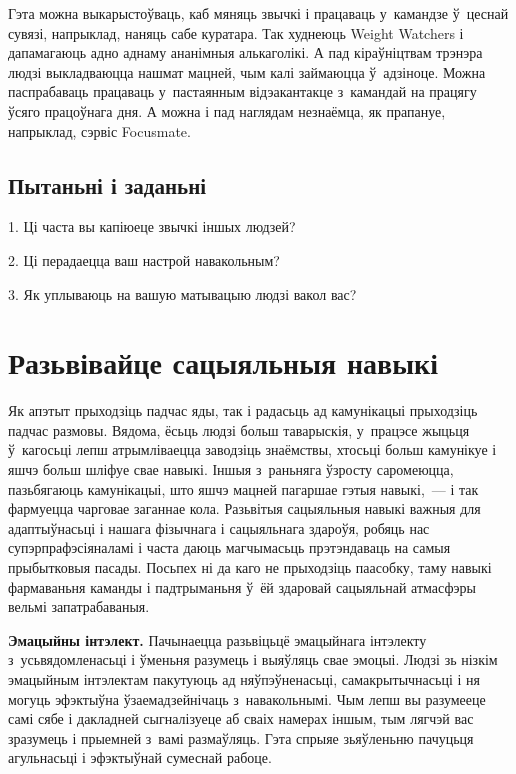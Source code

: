 Гэта можна выкарыстоўваць, каб мяняць звычкі і працаваць у~камандзе ў~цеснай сувязі, напрыклад, наняць сабе куратара. Так худнеюць Weight Watchers і дапамагаюць адно аднаму ананімныя алькаголікі. А пад кіраўніцтвам трэнэра людзі выкладваюцца нашмат мацней, чым калі займаюцца ў~адзіноце. Можна паспрабаваць працаваць у~пастаянным відэакантакце з~камандай на працягу ўсяго працоўнага дня. А можна і пад наглядам незнаёмца, як прапануе, напрыклад, сэрвіс Focusmate.

\subsection*{Пытаньні і заданьні}

1. Ці часта вы капіюеце звычкі іншых людзей?

2. Ці перадаецца ваш настрой навакольным?

3. Як уплываюць на вашую матывацыю людзі вакол вас?


\section{Разьвівайце сацыяльныя навыкі}

Як апэтыт прыходзіць падчас яды, так і радасьць ад камунікацыі прыходзіць падчас размовы. Вядома, ёсьць людзі больш таварыскія, у~працэсе жыцьця ў~кагосьці лепш атрымліваецца заводзіць знаёмствы, хтосьці больш камунікуе і яшчэ больш шліфуе свае навыкі. Іншыя з~раньняга ўзросту саромеюцца, пазьбягаюць камунікацыі, што яшчэ мацней пагаршае гэтыя навыкі,~--- і так фармуецца чарговае заганнае кола. Разьвітыя сацыяльныя навыкі важныя для адаптыўнасьці і нашага фізычнага і сацыяльнага здароўя, робяць нас супэрпрафэсіяналамі і часта даюць магчымасьць прэтэндаваць на самыя прыбытковыя пасады. Посьпех ні да каго не прыходзіць паасобку, таму навыкі фармаваньня каманды і падтрыманьня ў~ёй здаровай сацыяльнай атмасфэры вельмі запатрабаваныя.

\textbf{Эмацыйны інтэлект.} Пачынаецца разьвіцьцё эмацыйнага інтэлекту з~усьвядомленасьці і ўменьня разумець і выяўляць свае эмоцыі. Людзі зь нізкім эмацыйным інтэлектам пакутуюць ад няўпэўненасьці, самакрытычнасьці і ня могуць эфэктыўна ўзаемадзейнічаць з~навакольнымі. Чым лепш вы разумееце самі сябе і дакладней сыгналізуеце аб сваіх намерах іншым, тым лягчэй вас зразумець і прыемней з~вамі размаўляць. Гэта спрыяе зьяўленьню пачуцьця агульнасьці і эфэктыўнай сумеснай рабоце.


